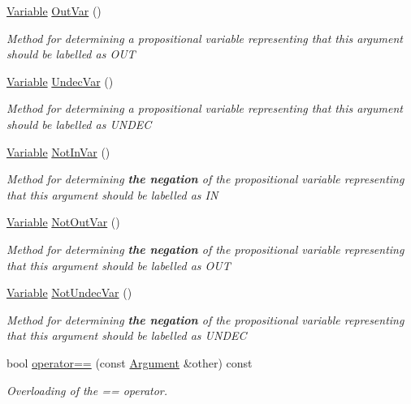 \begin{DoxyCompactItemize}
\hyperlink{classVariable}{Variable} \hyperlink{classArgument_a22f8d770c9dabeee5400104f11cd94e9}{Out\-Var} ()
\begin{DoxyCompactList}\small\item\em Method for determining a propositional variable representing that this argument should be labelled as {\ttfamily O\-U\-T} \end{DoxyCompactList}\item 
\hyperlink{classVariable}{Variable} \hyperlink{classArgument_a6b6fc0ba74c480e9186fe2860487008c}{Undec\-Var} ()
\begin{DoxyCompactList}\small\item\em Method for determining a propositional variable representing that this argument should be labelled as {\ttfamily U\-N\-D\-E\-C} \end{DoxyCompactList}\item 
\hyperlink{classVariable}{Variable} \hyperlink{classArgument_a19efdd00a8dbf15271a311a720e300a4}{Not\-In\-Var} ()
\begin{DoxyCompactList}\small\item\em Method for determining {\bfseries the negation} of the propositional variable representing that this argument should be labelled as {\ttfamily I\-N} \end{DoxyCompactList}\item 
\hyperlink{classVariable}{Variable} \hyperlink{classArgument_a0db86f8dcbb8aed850aa5d7c0a689372}{Not\-Out\-Var} ()
\begin{DoxyCompactList}\small\item\em Method for determining {\bfseries the negation} of the propositional variable representing that this argument should be labelled as {\ttfamily O\-U\-T} \end{DoxyCompactList}\item 
\hyperlink{classVariable}{Variable} \hyperlink{classArgument_a0b8fb438e4de8a4348e754714363fbf3}{Not\-Undec\-Var} ()
\begin{DoxyCompactList}\small\item\em Method for determining {\bfseries the negation} of the propositional variable representing that this argument should be labelled as {\ttfamily U\-N\-D\-E\-C} \end{DoxyCompactList}\item 
bool \hyperlink{classArgument_a44a615fda392650c5dc42036d9f4b1fc}{operator==} (const \hyperlink{classArgument}{Argument} \&other) const 
\begin{DoxyCompactList}\small\item\em Overloading of the == operator. \end{DoxyCompactList}\item 

\end{DoxyCompactItemize}
